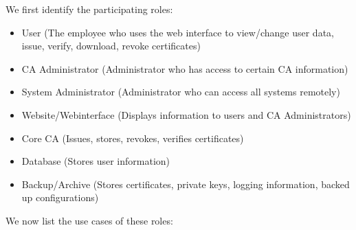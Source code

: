 \documentclass[a4paper, toc=index, 12pt, DIV14, twoside, BCOR2cm, headsepline, numbers=noenddot, bibliography=totoc]{report}
\begin{document}
We first identify the participating roles:
\begin{itemize}
\item User (The employee who uses the web interface to view/change user data, issue, verify, download, revoke certificates)
\item CA Administrator (Administrator who has access to certain CA information)
\item System Administrator (Administrator who can access all systems remotely)
\item Website/Webinterface (Displays information to users and CA Administrators)
\item Core CA (Issues, stores, revokes, verifies certificates)
\item Database (Stores user information)
\item Backup/Archive (Stores certificates, private keys, logging information, backed up configurations)
\end{itemize}
We now list the use cases of these roles:
\end{document}
